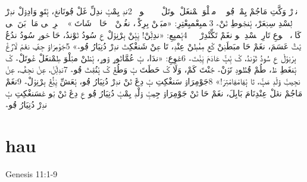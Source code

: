 \documentclass[12pt,fleqn,titlepage,twoside,a4paper]{book}
\begin{document}
\begin{arab}[utf]
\section*{}

ندٜرْ وَکَّتِ مَاجُمْ يِمْࢡٜ ڢُو طٛنّٛ مبٛلْوَ طٜمْنغَلْ غٛوتَلْ عٜ بٛلّٜ غٛوتٜ؞ 2ندٜ يِمْࢡٜ ندِلِّ غَلْ ڢُونَانغٜ، ࢡٜتَوِ وَادِوٛلْ ندٜرْ لٜسْدِ سِنٜعَرْ، ࢡٜنجٛوطِ تٛنْ؞ 3ࢡٜمبِعْمبِعْتِرِ‏: «مبَطٜنْ بِرِکْجٜ، نغُلٜنْ طٜ حَا طٜ شَاتَ؞» ࢡٜࢩِࢡْرِ بٜى مَاجٜ بَنَ بٜى کَاعٜ، ࢡٜکٛوعِ تَارِ لٜسْدِ بٛو نغَمْ تَکِّنْدِرْغٛ طٜ؞ 4ࢡٜمبِعِ‏: «ندِلّٜنْ‏! ࢩِࢡٜنْ بٜرْنِوٛلْ عٜ سُودُ تٛوْندُ، حَا حٛورٜ سُودُ ندُعُ يٛتّٛ عَسَمَ، نغَمْ حَا مبَطَنٜنْ کٛعٜ مٜىٰطٜنْ عِنْدٜ، تَا عٜنْ شَنغْکِتٛ ندٜرْ دُنِيَارُ ڢُو؞» 5جَوْمِرَاوٛ جِݠِّ نغَمْ لَارُغٛ بٜرْنِوٛلْ عٜ سُودُ تٛوْندُ، کٛ ࢡِࢡّٜ عَادَمَ ࢩِࢡَتَ؞ 6عٛوِعِ‏: «ندَا، ࢡٜ عُمَّاتٛورٜ وٛورٜ، ࢡٜطٛنْ مبٛلْوَ طٜمْنغَلْ غٛوتَلْ؞ کٛ ࢡٜنغَطِ طٛ، طُمْ ڢُطّٛودٜ تَوٛنْ؞ جٛنْتَ کَمْ، وَلَا کٛ حَطَتَ ࢡٜ وَطُغٛ کٛ ࢡٜنُڢٛتٛ ڢُو؞ 7ندِلّٜنْ، عٜنْ نجِݠّٛ، عٜنْ نجِيࢡَ وٛلْدٜ مَࢡّٜ، تَا ࢡٜݠَامْݠَامْتِرَ‏!» 8جَوْمِرَاوٛ سَنغْکِتِ ࢡٜ دِغَ تٛنْ ندٜرْ دُنِيَارُ ڢُو، ࢡٜعَشِّ ࢩِࢡُغٛ بٜرْنِوٛلْ؞ 9نغَمْ مَاجُمْ نغٛلْ عِنْدِنَامَ بَابِلَ، نغَمْ حَا تٛنْ جَوْمِرَاوٛ جِيࢡِ وٛلْدٜ يِمْࢡٜ دُنِيَارُ ڢُو عٜ دِغَ تٛنْ بٛو عٛسَنغْکِتِ ࢡٜ ندٜرْ دُنِيَارُ ڢُو؞

\end{arab}


\section{hau}

 Genesis 11:1-9
\end{document}
